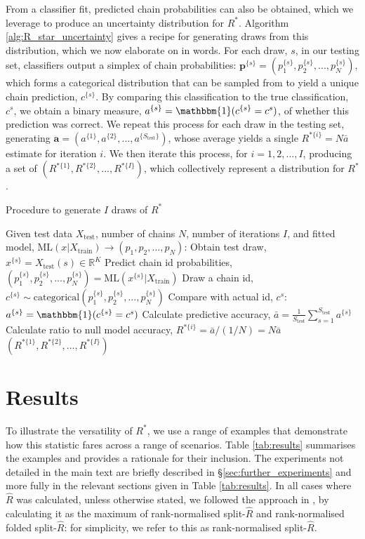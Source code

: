 \documentclass[ba]{imsart}
\numberwithin{equation}{section}
\theoremstyle{plain}
\begin{document}
From a classifier fit, predicted chain probabilities can also be obtained, which we leverage to produce an uncertainty distribution for $R^*$. Algorithm \ref{alg:R_star_uncertainty} gives a recipe for generating draws from this distribution, which we now elaborate on in words. For each draw, $s$, in our testing set, classifiers output a simplex of chain probabilities: $\boldsymbol{p}^{\{s\}}=(p_1^{\{s\}},p_2^{\{s\}},...,p_N^{\{s\}})$, which forms a categorical distribution that can be sampled from to yield a unique chain prediction, $c^{\{s\}}$. By comparing this classification to the true classification, $c^s$, we obtain a binary measure, $a^{\{s\}}=\mathbbm{1}(c^{\{s\}}=c^s)$, of whether this prediction was correct. We repeat this process for each draw in the testing set, generating $\boldsymbol{a}=(a^{\{1\}},a^{\{2\}},...,a^{\{S_\text{test}\}})$, whose average yields a single $R^{*\{i\}}=N \bar{a}$ estimate for iteration $i$. We then iterate this process, for $i=1,2,...,I$, producing a set of $(R^{*\{1\}},R^{*\{2\}},...,R^{*\{I\}})$, which collectively represent a distribution for $R^*$. 


\begin{algorithm}[tb]
	\caption{Procedure to generate $I$ draws of $R^*$}
	\label{alg:R_star_uncertainty}
	\begin{algorithmic}
		\STATE Given test data $X_\text{test}$, number of chains $N$, number of iterations $I$, and fitted
		\STATE model, $\text{ML}(x|X_\text{train})\rightarrow(p_1,p_2,...,p_N)$:
		\STATE Obtain test draw, $x^{\{s\}}=X_\text{test}(s)\in \mathbb{R}^K$
		\STATE Predict chain id probabilities, $(p_1^{\{s\}},p_2^{\{s\}},...,p_N^{\{s\}})= \text{ML}(x^{\{s\}}|X_\text{train})$
		\STATE Draw a chain id, $c^{\{s\}} \sim \text{categorical}(p_1^{\{s\}},p_2^{\{s\}},...,p_N^{\{s\}})$
		\STATE Compare with actual id, $c^s$: $a^{\{s\}}=\mathbbm{1}(c^{\{s\}}=c^s)$
		\ENDFOR
		\STATE Calculate predictive accuracy, $\bar{a} = \frac{1}{S_\text{test}} \sum_{s=1}^{S_\text{test}} a^{\{s\}}$
		\STATE Calculate ratio to null model accuracy, $R^{*\{i\}} = \bar{a} / (1 / N) = N\bar{a}$
		\ENDFOR
		\RETURN $(R^{*\{1\}},R^{*\{2\}},...,R^{*\{I\}})$
	\end{algorithmic}
\end{algorithm}


\section{Results}\label{sec:results}
To illustrate the versatility of $R^*$, we use a range of examples that demonstrate how this statistic fares across a range of scenarios. Table \ref{tab:results} summarises the examples and provides a rationale for their inclusion. The experiments not detailed in the main text are briefly described in \S\ref{sec:further_experiments} and more fully in the relevant sections given in Table \ref{tab:results}. In all cases where $\widehat{R}$ was calculated, unless otherwise stated, we followed the approach in \cite{vehtari2019rank}, by calculating it as the maximum of rank-normalised split-$\widehat{R}$ and rank-normalised folded split-$\widehat{R}$: for simplicity, we refer to this as rank-normalised split-$\widehat{R}$.
\end{document}
